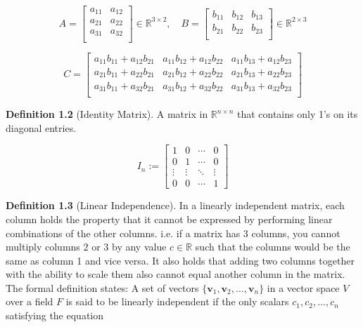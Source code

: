 \documentclass{report}
\begin{document}
\[ A = \begin{bmatrix} 
a_{11} & a_{12} \\
a_{21} & a_{22} \\
a_{31} & a_{32} \\
\end{bmatrix} \in \mathbb{R}^{3 \times 2}, \quad
B = \begin{bmatrix} 
b_{11} & b_{12} & b_{13} \\
b_{21} & b_{22} & b_{23} \\
\end{bmatrix} \in \mathbb{R}^{2 \times 3}\]

\[ C = \begin{bmatrix} 
a_{11}b_{11} + a_{12}b_{21} & a_{11}b_{12} + a_{12}b_{22} & a_{11}b_{13} + a_{12}b_{23} \\
a_{21}b_{11} + a_{22}b_{21} & a_{21}b_{12} + a_{22}b_{22} & a_{21}b_{13} + a_{22}b_{23} \\
a_{31}b_{11} + a_{32}b_{21} & a_{31}b_{12} + a_{32}b_{22} & a_{31}b_{13} + a_{32}b_{23} \\
\end{bmatrix} \]

\noindent \textbf{Definition 1.2} (Identity Matrix).
A matrix in $\mathbb{R}^{n \times n}$ that contains only 1's on its diagonal entries. 

\[ I_n := \begin{bmatrix} 
1 & 0 & \cdots & 0 \\
0 & 1 & \cdots & 0 \\
\vdots & \vdots & \ddots & \vdots \\
0 & 0 & \cdots & 1
\end{bmatrix} \]


\newpage
\noindent \textbf{Definition 1.3} (Linear Independence).
In a linearly independent matrix, each column holds the property that it cannot be expressed by performing linear combinations of the other columns. i.e. if a matrix has 3 columns, you cannot multiply columns 2 or 3 by any value $c \in \mathbb{R}$ such that the columns would be the same as column 1 and vice versa. It also holds that adding two columns together with the ability to scale them also cannot equal another column in the matrix. \\
The formal definition states: 
A set of vectors \( \{ \mathbf{v}_1, \mathbf{v}_2, \ldots, \mathbf{v}_n \} \) in a vector space \( V \) over a field \( F \) is said to be linearly independent if the only scalars \( c_1, c_2, \ldots, c_n \) satisfying the equation
\end{document}

